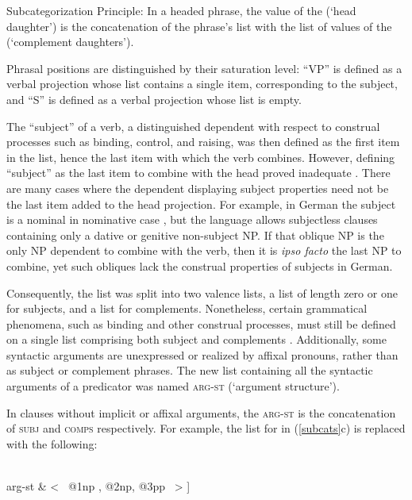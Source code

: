 \documentclass[output=paper
                ,modfonts
                ,nonflat
	        ,collection
	        ,collectionchapter
	        ,collectiontoclongg
 	        ,biblatex
                ,babelshorthands
                ,newtxmath
                ,draftmode
                ,colorlinks, citecolor=brown
]{./langsci/langscibook}
\begin{document}
\begin{exe}
\ex Subcategorization Principle: In a headed phrase, the \subcat value of the \headdtr (`head daughter') is the concatenation of the phrase's \subcat list with the list of \synsem values of the \compsdtrs (`complement daughters').
\end{exe}

\noindent
Phrasal positions are distinguished by their saturation level: ``VP'' is defined as a verbal projection whose \subcat list contains a single item, corresponding to the subject, and ``S'' is defined as a verbal projection whose  \subcat list is empty. 

The ``subject'' of a verb, a distinguished dependent with respect to construal processes such as binding, control, and raising, was then defined as the first item in the  \subcat list, hence the last item with which the verb combines.   However, defining ``subject'' as the last item to combine with the head proved inadequate \citep[Chapter~9]{pollard+sag:1994}.  There are many cases where the dependent displaying subject properties need not be the last item added to the head projection.  For example, in German the subject is a nominal in nominative case \citep{Reis82}, but the language allows subjectless clauses containing only a dative or genitive non-subject NP.  If that oblique  NP is the only NP dependent to combine with the verb, then it is \emph{ipso facto} the last NP to combine, yet such obliques lack the construal properties of subjects in German.  

Consequently, the \subcat list was split into two valence lists, a \subj list of length zero or one for subjects, and a \comps list for complements.  Nonetheless, certain grammatical phenomena, such as binding and other construal processes, must still be defined on a single list comprising both subject and complements \citep{Manning+Sag:1999}. Additionally, some syntactic arguments are unexpressed or realized by affixal pronouns, rather than as subject or complement phrases.  
The new list containing all the syntactic arguments of a predicator was named \textsc{arg-st} (`argument structure').  

In clauses without implicit or affixal arguments, the \textsc{arg-st} is the concatenation of  \textsc{subj}  and \textsc{comps}  respectively.  For example, the \subcat list for  in (\ref{subcats}c) is replaced with the following:

\begin{exe} 
	\label{put}
\ex	%
\begin{avm}
[ phon & < \rm put > \\
val & [ subj \ \ & <  \ {@1} \ > \\ 
comps \ \ & < \  {@2}, {@3} \  > ] \\ 
arg-st & < \ {@1}np , {@2}np, {@3}pp \  > ] 
\end{avm}
\end{exe}
\end{document}
